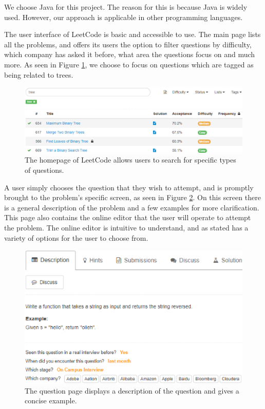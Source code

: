 \documentclass[conference]{IEEEtran}
\begin{document}
We choose Java for this project. The reason for this is because Java is widely used. However, our approach is applicable in other programming languages. 

The user interface of LeetCode is basic and accessible to use. The main page lists all the problems, and offers its users the option to filter questions by difficulty, which company has asked it before, what area the questions focus on and much more. As seen in Figure \ref{fig:homepage}, we choose to focus on questions which are tagged as being related to trees.


\begin{figure}[h]
\includegraphics[scale=0.4]{homepageUI}
\caption{The homepage of LeetCode allows users to search for specific types of questions.}
\label{fig:homepage}
\end{figure}

A user simply chooses the question that they wish to attempt, and is promptly brought to the problem's specific screen, as seen in Figure \ref{fig:problemPage}. On this screen there is a general description of the problem and a few examples for more clarification. This page also contains the online editor that the user will operate to attempt the problem. The online editor is intuitive to understand, and as stated has a variety of options for the user to choose from. 
\begin{figure}[h]
\includegraphics[scale=0.4]{problemPage}
\caption{The question page displays a description of the question and gives a concise example.}
\label{fig:problemPage}
\end{figure}
\end{document}
